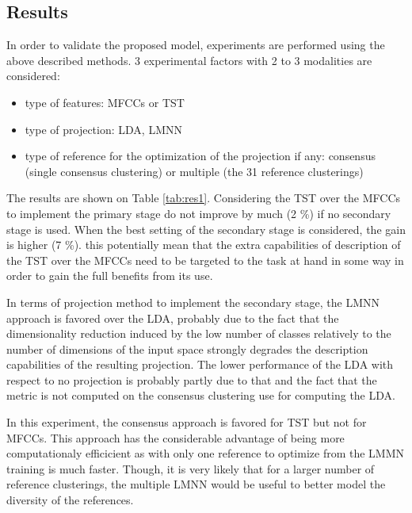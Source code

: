 \documentclass{article}
\begin{document}
\subsection{Results}

In order to validate the proposed model, experiments are performed using the above described methods. 3 experimental factors with 2 to 3 modalities are considered:
\begin{itemize}
  \item type of features: MFCCs or TST
  \item type of projection: LDA, LMNN
  \item type of reference for the optimization of the projection if any: consensus (single consensus clustering) or multiple (the 31 reference clusterings)
\end{itemize}
The results are shown on Table \ref{tab:res1}. Considering the TST over the MFCCs to implement the primary stage do not improve by much (2 \%) if no secondary stage is used. When the best setting of the secondary stage is considered, the gain is higher (7 \%). this potentially mean that the extra capabilities of description of the TST over the MFCCs need to be targeted to the task at hand in some way in order to gain the full benefits from its use.

In terms of projection method to implement the secondary stage, the LMNN approach is favored over the LDA, probably due to the fact that the dimensionality reduction induced by the low number of classes relatively to the number of dimensions of the input space strongly degrades the description capabilities of the resulting projection. The lower performance of the LDA with respect to no projection is probably partly due to that and the fact that the metric is not computed on the consensus clustering use for computing the LDA.

In this experiment, the consensus approach is favored for TST but not for MFCCs. This approach has the considerable advantage of being more computationaly efficicient as with only one reference to optimize from the LMMN training is much faster. Though, it is very likely that for a larger number of reference clusterings, the multiple LMNN would be useful to better model the diversity of the references.
\end{document}

